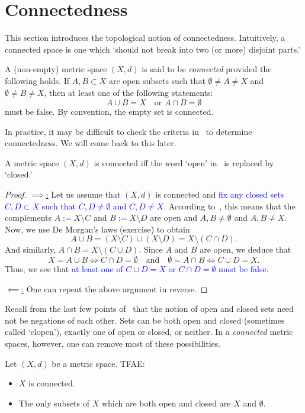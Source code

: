 \section{Connectedness}
\label{sec:connected}
This section introduces the topological notion of connectedness. Intuitively, a connected space is one which `should not break into two (or more) disjoint parts.'
\begin{defn}[Connected]
	\label{defn:connected}
	A (non-empty) metric space $(X,d)$ is said to be \textit{connected} provided the following holds. If $A,B\subset X$ are open subsets such that $\emptyset \neq A \neq X$ and $\emptyset \neq B \neq X$, then at least one of the following statements:
	\[
	A\cup B = X\quad\text{or }A\cap B = \emptyset
	\]
	must be false. By convention, the empty set is connected.
\end{defn}
In practice, it may be difficult to check the criteria in~ to determine connectedness. We will come back to this later.
\begin{lemma}
	\label{lem:closed_connect}
	A metric space $(X,d)$ is connected iff the word `open' in~ is replaced by `closed.'
\end{lemma}
\begin{proof}
	\ul{$\implies$:} Let us assume that $(X,d)$ is connected and \textcolor{blue}{fix any closed sets $C,D\subset X$ such that $C,D\neq \emptyset$ and $C,D \neq X$}. According to~, this means that the complements $A:= X\setminus C$ and $B:= X\setminus D$ are open and $A,B\neq \emptyset$ and $A,B\neq X$. Now, we use De Morgan's laws (exercise) to obtain
	\[
	A \cup B = (X\setminus C)\cup (X \setminus D) = X \setminus (C\cap D).
	\]
	And similarly, $A\cap B = X\setminus (C \cup D)$. Since $A$ and $B$ are open, we deduce that
	\[
	X = A\cup B \iff C\cap D = \emptyset\quad\text{and}\quad\emptyset = A \cap B \iff C \cup D = X.
	\]
	Thus, we see that \textcolor{blue}{at least one of $C \cup D = X$ or $C\cap D = \emptyset$ must be false.}
	
	\ul{$\impliedby$:} One can repeat the above argument in reverse.
\end{proof}
Recall from the last few points of~ that the notion of open and closed sets need not be negations of each other. Sets can be both open and closed (sometimes called `clopen'), exactly one of open or closed, or neither. In a \textit{connected} metric spaces, however, one can remove most of these possibilities.
\begin{prop}
	\label{prop:clopen_connected}
	Let $(X,d)$ be a metric space. TFAE:
	\begin{itemize}
		\item $X$ is connected.
		\item The only subsets of $X$ which are both open and closed are $X$ and $\emptyset$.
	\end{itemize}
\end{prop}
